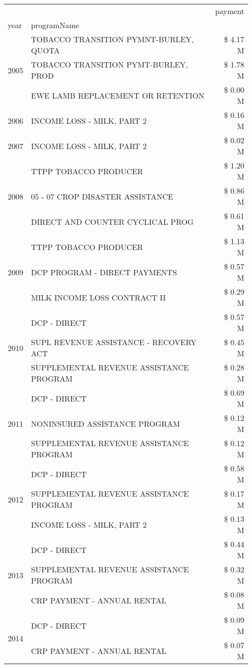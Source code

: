 \begin{tabular}{llr}
\toprule
 &  & payment \\
year & programName &  \\
\midrule
\multirow[t]{3}{*}{2005} & TOBACCO TRANSITION PYMNT-BURLEY, QUOTA & \$ 4.17 M \\
 & TOBACCO TRANSITION PYMT-BURLEY, PROD & \$ 1.78 M \\
 & EWE LAMB REPLACEMENT OR RETENTION & \$ 0.00 M \\
\cline{1-3}
2006 & INCOME LOSS - MILK, PART 2 & \$ 0.16 M \\
\cline{1-3}
2007 & INCOME LOSS - MILK, PART 2 & \$ 0.02 M \\
\cline{1-3}
\multirow[t]{3}{*}{2008} & TTPP TOBACCO PRODUCER & \$ 1.20 M \\
 & 05 - 07 CROP DISASTER ASSISTANCE & \$ 0.86 M \\
 & DIRECT AND COUNTER CYCLICAL PROG & \$ 0.61 M \\
\cline{1-3}
\multirow[t]{3}{*}{2009} & TTPP TOBACCO PRODUCER & \$ 1.13 M \\
 & DCP PROGRAM - DIRECT PAYMENTS & \$ 0.57 M \\
 & MILK INCOME LOSS CONTRACT II & \$ 0.29 M \\
\cline{1-3}
\multirow[t]{3}{*}{2010} & DCP - DIRECT & \$ 0.57 M \\
 & SUPL REVENUE ASSISTANCE - RECOVERY ACT & \$ 0.45 M \\
 & SUPPLEMENTAL REVENUE ASSISTANCE PROGRAM & \$ 0.28 M \\
\cline{1-3}
\multirow[t]{3}{*}{2011} & DCP - DIRECT & \$ 0.69 M \\
 & NONINSURED ASSISTANCE PROGRAM & \$ 0.12 M \\
 & SUPPLEMENTAL REVENUE ASSISTANCE PROGRAM & \$ 0.12 M \\
\cline{1-3}
\multirow[t]{3}{*}{2012} & DCP - DIRECT & \$ 0.58 M \\
 & SUPPLEMENTAL REVENUE ASSISTANCE PROGRAM & \$ 0.17 M \\
 & INCOME LOSS - MILK, PART 2 & \$ 0.13 M \\
\cline{1-3}
\multirow[t]{3}{*}{2013} & DCP - DIRECT & \$ 0.44 M \\
 & SUPPLEMENTAL REVENUE ASSISTANCE PROGRAM & \$ 0.32 M \\
 & CRP PAYMENT - ANNUAL RENTAL & \$ 0.08 M \\
\cline{1-3}
\multirow[t]{3}{*}{2014} & DCP - DIRECT & \$ 0.09 M \\
 & CRP PAYMENT - ANNUAL RENTAL & \$ 0.07 M \\

\end{tabular}
